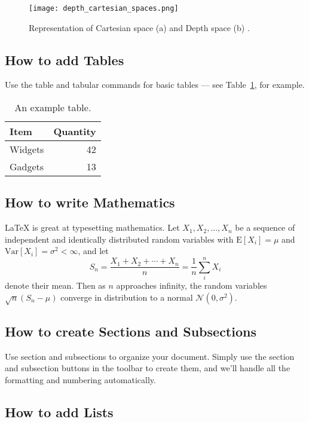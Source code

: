 \documentclass[smallextended]{svjour3}
\begin{document}
\begin{figure}
\centering
\texttt{[image: depth\_cartesian\_spaces.png]}
\caption{\label{fig:spaces}Representation of Cartesian space (a) and Depth space (b) \cite{Ref1}.}
\end{figure}

\subsection{How to add Tables}

Use the table and tabular commands for basic tables --- see Table~\ref{tab:widgets}, for example. 

\begin{table}
\centering
\begin{tabular}{l|r}
Item & Quantity \\\hline
Widgets & 42 \\
Gadgets & 13
\end{tabular}
\caption{\label{tab:widgets}An example table.}
\end{table}

\subsection{How to write Mathematics}

\LaTeX{} is great at typesetting mathematics. Let $X_1, X_2, \ldots, X_n$ be a sequence of independent and identically distributed random variables with $\text{E}[X_i] = \mu$ and $\text{Var}[X_i] = \sigma^2 < \infty$, and let
\[S_n = \frac{X_1 + X_2 + \cdots + X_n}{n}
      = \frac{1}{n}\sum_{i}^{n} X_i\]
denote their mean. Then as $n$ approaches infinity, the random variables $\sqrt{n}(S_n - \mu)$ converge in distribution to a normal $\mathcal{N}(0, \sigma^2)$.


\subsection{How to create Sections and Subsections}

Use section and subsections to organize your document. Simply use the section and subsection buttons in the toolbar to create them, and we'll handle all the formatting and numbering automatically.

\subsection{How to add Lists}
\end{document}

